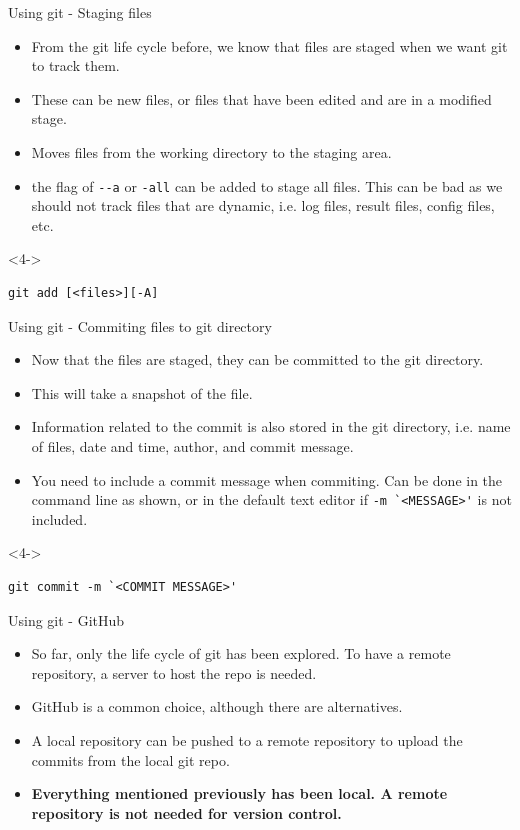 \documentclass{beamer}
\begin{document}
\begin{frame}[fragile]{Using git - Staging files}
  \begin{itemize}
    \item <1-> From the git life cycle before, we know that files are staged when we want git to track them.
    \item <2-> These can be new files, or files that have been edited and are in a modified stage. 
    \item <3-> Moves files from the working directory to the staging area.
    \item <4-> the flag of \lstinline{--a} or \lstinline{-all} can be added to stage all files. This can be bad as we should not track files that are dynamic, i.e. log files, result files, config files, etc.
  \end{itemize}  
  \begin{onlyenv}<4->
    \begin{lstlisting}[frame=single]
      git add [<files>][-A]
    \end{lstlisting}
  \end{onlyenv}
\end{frame}

\begin{frame}[fragile]{Using git - Commiting files to git directory}
  \begin{itemize}
    \item <1-> Now that the files are staged, they can be committed to the git directory.
    \item <2-> This will take a snapshot of the file. 
    \item <3-> Information related to the commit is also stored in the git directory, i.e. name of files, date and time, author, and commit message.
    \item <4-> You need to include a commit message when commiting. Can be done in the command line as shown, or in the default text editor if \lstinline{-m `<MESSAGE>'} is not included.
  \end{itemize}
  \begin{onlyenv}<4->
    \begin{lstlisting}[frame=single]
      git commit -m `<COMMIT MESSAGE>'
    \end{lstlisting}
  \end{onlyenv}
\end{frame}

\begin{frame}{Using git - GitHub}
  \begin{itemize}
    \item <1-> So far, only the life cycle of git has been explored. To have a remote repository, a server to host the repo is needed.
    \item <2-> GitHub is a common choice, although there are alternatives.
    \item <3-> A local repository can be pushed to a remote repository to upload the commits from the local git repo.
    \item <4-> \textbf{Everything mentioned previously has been local. A remote repository is not needed for version control. }
  \end{itemize}
\end{frame}
\end{document}
